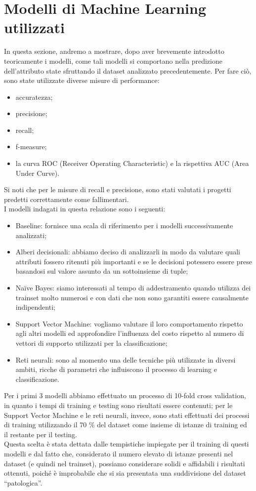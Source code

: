 \section{Modelli di Machine Learning utilizzati}
In questa sezione, andremo a mostrare, dopo aver brevemente introdotto teoricamente i modelli, come tali modelli si comportano nella predizione dell'attributo state sfruttando il dataset analizzato precedentemente.
Per fare ciò, sono state utilizzate diverse misure di performance: \begin{itemize}
	\item accuratezza;
	\item precisione;
	\item recall;
	\item f-measure;
	\item la curva ROC (Receiver Operating Characteristic) e la rispettiva AUC (Area Under Curve). 
\end{itemize}
Si noti che per le misure di recall e precisione, sono stati valutati i progetti predetti correttamente come fallimentari.\\
I modelli indagati in questa relazione sono i seguenti:\begin{itemize}
	\item Baseline: fornisce una scala di riferimento per i modelli successivamente analizzati;
	\item Alberi decisionali: abbiamo deciso di analizzarli in modo da valutare quali attributi fossero ritenuti più importanti e se le decisioni potessero essere prese basandosi sul valore assunto da un sottoinsieme di tuple;
	\item Na\"ive Bayes: siamo interessati al tempo di addestramento quando utilizza dei trainset molto numerosi e con dati che non sono garantiti essere causalmente indipendenti;
	\item Support Vector Machine: vogliamo valutare il loro comportamento rispetto agli altri modelli ed approfondire l'influenza del costo rispetto al numero di vettori di supporto utilizzati per la classificazione;
	\item Reti neurali: sono al momento una delle tecniche più utilizzate in diversi ambiti, ricche di parametri che influiscono il processo di learning e classificazione.
\end{itemize}
Per i primi 3 modelli abbiamo effettuato un processo di 10-fold cross validation, in quanto i tempi di training e testing sono risultati essere contenuti; per le Support Vector Machine e le reti neurali, invece, sono stati effettuati dei processi di training utilizzando il 70 \% del dataset come insieme di istanze di training ed il restante per il testing.\\
Questa scelta è stata dettata dalle tempistiche impiegate per il training di questi modelli e dal fatto che, considerato il numero elevato di istanze presenti nel dataset (e quindi nel trainset), possiamo considerare solidi e affidabili i risultati ottenuti, poiché è improbabile che si sia presentata una suddivisione del dataset “patologica”.

